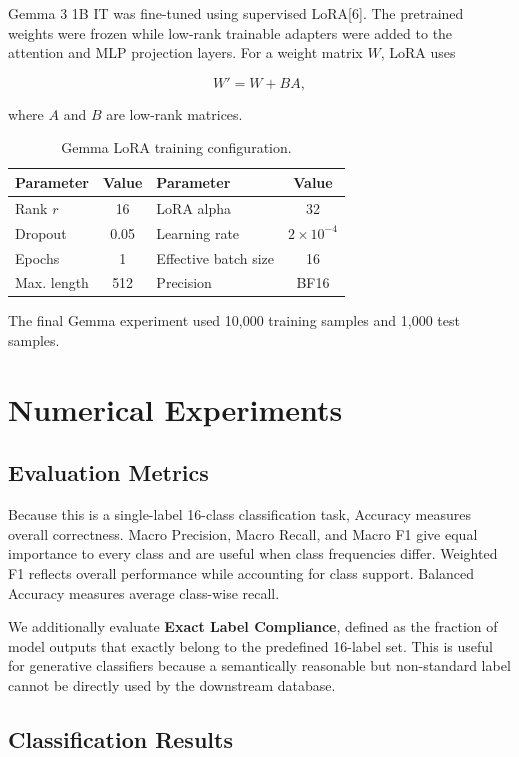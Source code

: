 \documentclass{article}
\begin{document}
Gemma 3 1B IT was fine-tuned using supervised LoRA[6]. The pretrained weights
were frozen while low-rank trainable adapters were added to the attention
and MLP projection layers. For a weight matrix $W$, LoRA uses

\[
W' = W + BA,
\]

where $A$ and $B$ are low-rank matrices.

\begin{table}[h]
\centering
\caption{Gemma LoRA training configuration.}
\label{tab:lora}
\small
\begin{tabular}{lc@{\qquad}lc}
\toprule
Parameter & Value & Parameter & Value \\
\midrule
Rank $r$ & 16 & LoRA alpha & 32 \\
Dropout & 0.05 & Learning rate & $2\times10^{-4}$ \\
Epochs & 1 & Effective batch size & 16 \\
Max. length & 512 & Precision & BF16 \\
\bottomrule
\end{tabular}
\end{table}

The final Gemma experiment used 10,000 training samples and 1,000 test
samples. 


\section{Numerical Experiments}

\subsection{Evaluation Metrics}

Because this is a single-label 16-class classification task, Accuracy measures
overall correctness. Macro Precision, Macro Recall, and Macro F1 give equal
importance to every class and are useful when class frequencies differ.
Weighted F1 reflects overall performance while accounting for class support.
Balanced Accuracy measures average class-wise recall.

We additionally evaluate \textbf{Exact Label Compliance}, defined as the
fraction of model outputs that exactly belong to the predefined 16-label set.
This is useful for generative classifiers because a semantically reasonable
but non-standard label cannot be directly used by the downstream database.


\subsection{Classification Results}
\end{document}
